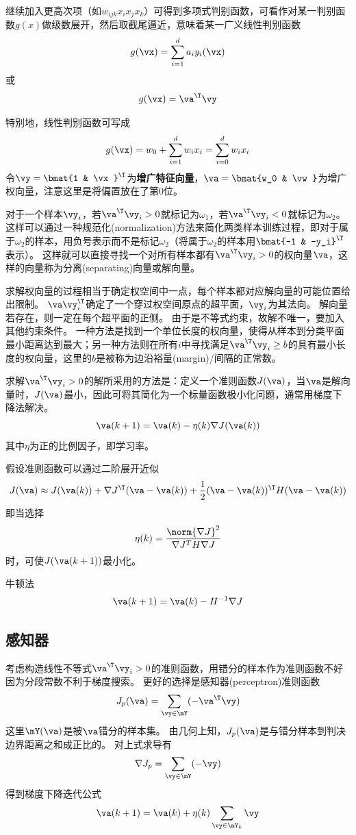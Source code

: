 继续加入更高次项（如$w_{ijk}x_ix_jx_k$）可得到多项式判别函数，可看作对某一判别函数$g(x)$做级数展开，然后取截尾逼近，意味着某一广义线性判别函数
\[g(\vx)=\sum_{i=1}^d a_iy_i(\vx)\]
或
\[g(\vx)=\va^\T\vy\]

特别地，线性判别函数可写成
\[g(\vx)=w_0+\sum_{i=1}^d w_i x_i=\sum_{i=0}^dw_ix_i\]
令$\vy=\bmat{1 & \vx}^\T$为\textbf{增广特征向量}，$\va=\bmat{w_0 & \vw}$为增广权向量，注意这里是将偏置放在了第$0$位。

对于一个样本$\vy_i$，若$\va^\T\vy_i>0$就标记为$\omega_1$，若$\va^\T\vy_i<0$就标记为$\omega_2$。
这样可以通过一种规范化(normalization)方法来简化两类样本训练过程，即对于属于$\omega_2$的样本，用负号表示而不是标记$\omega_2$（将属于$\omega_2$的样本用$\bmat{-1 & -y_i}^\T$表示）。
这样就可以直接寻找一个对所有样本都有$\va^\T\vy_i>0$的权向量$\va$，这样的向量称为分离(separating)向量或解向量。

求解权向量的过程相当于确定权空间中一点，每个样本都对应解向量的可能位置给出限制。
$\va\vy_i^\T$确定了一个穿过权空间原点的超平面，$\vy_i$为其法向。
解向量若存在，则一定在每个超平面的正侧。
由于是不等式约束，故解不唯一，要加入其他约束条件。
一种方法是找到一个单位长度的权向量，使得从样本到分类平面最小距离达到最大；另一种方法则在所有$i$中寻找满足$\va^\T\vy_i\geq b$的具有最小长度的权向量，这里的$b$是被称为边沿裕量(margin)/间隔的正常数。

求解$\va^\T\vy_i>0$的解所采用的方法是：定义一个准则函数$J(\va)$，当$\va$是解向量时，$J(\va)$最小，因此可将其简化为一个标量函数极小化问题，通常用梯度下降法解决。
\[\va(k+1)=\va(k)-\eta(k)\nabla J(\va(k))\]
其中$\eta$为正的比例因子，即学习率。

假设准则函数可以通过二阶展开近似
\[J(\va)\approx J(\va(k))+\nabla J^\T(\va-\va(k))+\frac{1}{2}(\va-\va(k))^\T H(\va-\va(k))\]
即当选择
\[\eta(k)=\frac{\norm{\nabla J}^2}{\nabla J^T H\nabla J}\]
时，可使$J(\va(k+1))$最小化。

牛顿法
\[\va(k+1)=\va(k)-H^{-1}\nabla J\]

\subsection{感知器}
考虑构造线性不等式$\va^\T\vy_i>0$的准则函数，用错分的样本作为准则函数不好因为分段常数不利于梯度搜索。
更好的选择是感知器(perceptron)准则函数
\[J_p(\va)=\sum_{\vy\in\mY}(-\va^\T\vy)\]
这里$\mY(\va)$是被$\va$错分的样本集。
由几何上知，$J_p(\va)$是与错分样本到判决边界距离之和成正比的。
对上式求导有
\[\nabla J_p=\sum_{\vy\in\mY}(-\vy)\]
得到梯度下降迭代公式
\[\va(k+1)=\va(k)+\eta(k)\sum_{\vy\in\mY_k}\vy\]

